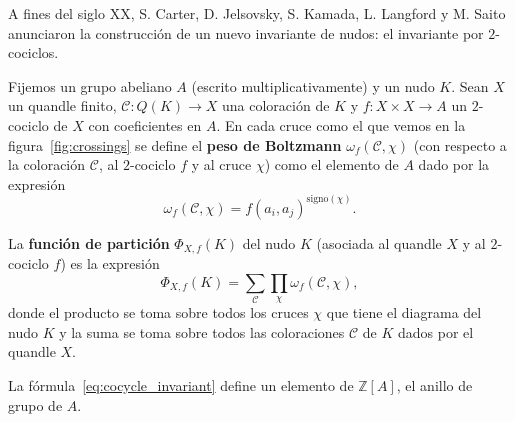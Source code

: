 \documentclass[graybox]{svmult}
\newcommand{\Z}{\mathbb{Z}}
\begin{document}
A fines del siglo XX, S. Carter, D. Jelsovsky, S. Kamada, L. Langford y M.
Saito anunciaron la construcción de un nuevo invariante de nudos: el invariante
por $2$-cociclos.

Fijemos un grupo abeliano $A$ (escrito multiplicativamente) y un nudo $K$.
Sean $X$ un quandle finito, $\mathcal{C}\colon Q(K)\to X$ una coloración de $K$ y 
$f\colon X\times X\to A$ 
un $2$-cociclo de $X$ con coeficientes en $A$. En cada cruce como el que vemos en la
figura~\ref{fig:crossings} se define el \textbf{peso de Boltzmann}
$\omega_f(\mathcal{C},\chi)$ (con respecto a la coloración $\mathcal{C}$, al
$2$-cociclo $f$ y al cruce $\chi$) como el elemento de $A$ dado por la
expresión 
\[
	\omega_f(\mathcal{C},\chi) =f(a_i,a_j)^{\mathrm{signo}(\chi)}.
\]

\begin{definition}
	La \textbf{función de partición} $\Phi_{X,f}(K)$ del nudo $K$ (asociada al
	quandle $X$ y al $2$-cociclo $f$) es la expresión
	\begin{equation}
		\label{eq:cocycle_invariant}
		\Phi_{X,f}(K)=\sum_{\mathcal{C}}\prod_{\chi}\omega_f(\mathcal{C},\chi),
	\end{equation}
	donde el producto se toma sobre todos los cruces $\chi$ que tiene el
	diagrama del nudo $K$ y la suma se toma sobre todos las coloraciones
	$\mathcal{C}$ de $K$ dados por el quandle $X$.  
\end{definition}

La fórmula~\eqref{eq:cocycle_invariant} define un elemento de $\Z[A]$, el
anillo de grupo de $A$.
\end{document}
